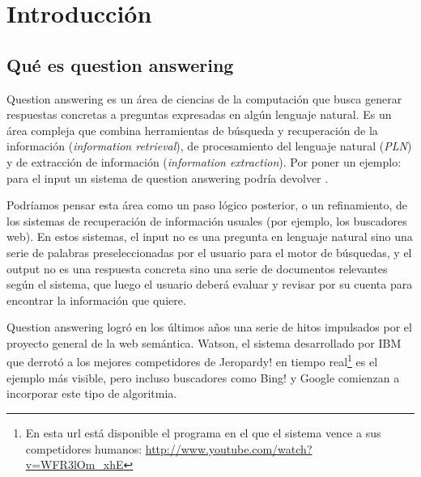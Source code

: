 
\chapter{Introducción}
\label{chap:intro}\label{chap:1}


\section{Qué es question answering}
\label{sec:que-es-qa}

Question answering es un área de ciencias de la computación que busca generar respuestas concretas a preguntas expresadas en algún lenguaje natural. Es un área compleja que combina herramientas de búsqueda y recuperación de la información (\textit{information retrieval}), de procesamiento del lenguaje natural (\textit{PLN}) y de extracción de información (\textit{information extraction}). Por poner un ejemplo: para el input \textit{} un sistema de question answering podría devolver .

Podríamos pensar esta área como un paso lógico posterior, o un refinamiento, de los sistemas de recuperación de información usuales (por ejemplo, los buscadores web). En estos sistemas, el input no es una pregunta en lenguaje natural sino una serie de palabras preseleccionadas por el usuario para el motor de búsquedas, y el output no es una respuesta concreta sino una serie de documentos relevantes según el sistema, que luego el usuario deberá evaluar y revisar por su cuenta para encontrar la información que quiere.

Question answering logró en los últimos años una serie de hitos impulsados por el proyecto general de la web semántica. Watson, el sistema desarrollado por IBM que derrotó a los mejores competidores de Jeropardy! en tiempo real\footnote{En esta url está disponible el programa en el que el sistema vence a sus competidores humanos: \url{http://www.youtube.com/watch?v=WFR3lOm_xhE}} es el ejemplo más visible, pero incluso buscadores como Bing! y Google comienzan a incorporar este tipo de algoritmia.

